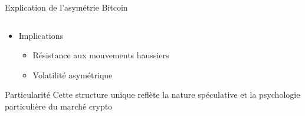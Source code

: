 \documentclass[aspectratio=169]{beamer}  %
\begin{document}
\begin{frame}{Explication de l'asymétrie Bitcoin}
\begin{columns}
\begin{column}{0.5\textwidth}
\begin{itemize}
                \item \small{Implications}
                \begin{itemize}
                    \item \footnotesize{Résistance aux mouvements haussiers}
                    \item \footnotesize{Volatilité asymétrique}
                \end{itemize}
            \end{itemize}
            \begin{alertblock}{Particularité}
                Cette structure unique reflète la nature spéculative et la psychologie particulière du marché crypto
            \end{alertblock}
        \end{column}
    \end{columns}
\end{frame}
\end{document}
